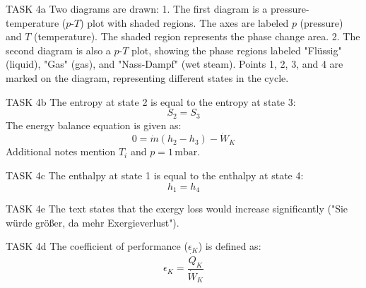 TASK 4a  
Two diagrams are drawn:  
1. The first diagram is a pressure-temperature (\(p\)-\(T\)) plot with shaded regions. The axes are labeled \(p\) (pressure) and \(T\) (temperature). The shaded region represents the phase change area.  
2. The second diagram is also a \(p\)-\(T\) plot, showing the phase regions labeled "Flüssig" (liquid), "Gas" (gas), and "Nass-Dampf" (wet steam). Points 1, 2, 3, and 4 are marked on the diagram, representing different states in the cycle.  

TASK 4b  
The entropy at state 2 is equal to the entropy at state 3:  
\[
S_2 = S_3
\]  
The energy balance equation is given as:  
\[
0 = \dot{m}(h_2 - h_3) - \dot{W}_K
\]  
Additional notes mention \(T_i\) and \(p = 1 \, \text{mbar}\).  

TASK 4c  
The enthalpy at state 1 is equal to the enthalpy at state 4:  
\[
h_1 = h_4
\]  

TASK 4e  
The text states that the exergy loss would increase significantly ("Sie würde größer, da mehr Exergieverlust").  

TASK 4d  
The coefficient of performance (\(\epsilon_K\)) is defined as:  
\[
\epsilon_K = \frac{\dot{Q}_K}{\dot{W}_K}
\]  